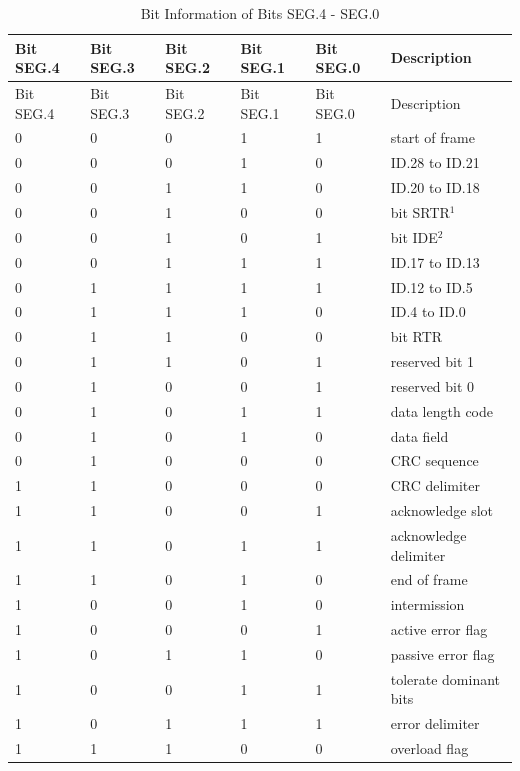\documentclass[main\_\_EN.tex]{subfiles}
\begin{document}
\begin{longtable}[c]{|p{2cm}<{\centering}|p{2cm}<{\centering}|p{2cm}<{\centering}|p{2cm}<{\centering}|p{2cm}<{\centering}|p{4cm}|}
    \caption{Bit Information of Bits SEG.4 - SEG.0}
    \label{table:Bit_information}\\
    \hline
    \rowcolor{lightgray}
   Bit SEG.4 & Bit SEG.3 & Bit SEG.2 & Bit SEG.1 & Bit SEG.0 & Description
   \\\hline
   \endfirsthead

   \hline
   \rowcolor{lightgray}
   Bit SEG.4 & Bit SEG.3 & Bit SEG.2 & Bit SEG.1 & Bit SEG.0 & Description
   \\\hline
   \endhead
   \endfoot
   \hline
   \endlastfoot

    0 & 0 & 0 & 1 & 1 & start of frame
    \\\hline
    0 & 0 & 0 & 1 & 0 & ID.28 to ID.21
    \\\hline
    0 & 0 & 1 & 1 & 0 & ID.20 to ID.18
    \\\hline
    0 & 0 & 1 & 0 & 0 & bit SRTR$^1$
    \\\hline
    0 & 0 & 1 & 0 & 1 & bit IDE$^2$
    \\\hline
    0 & 0 & 1 & 1 & 1 & ID.17 to ID.13
    \\\hline
    0 & 1 & 1 & 1 & 1 & ID.12 to ID.5
    \\\hline
    0 & 1 & 1 & 1 & 0 & ID.4 to ID.0
    \\\hline
    0 & 1 & 1 & 0 & 0 & bit RTR
    \\\hline
    0 & 1 & 1 & 0 & 1 & reserved bit 1
    \\\hline
    0 & 1 & 0 & 0 & 1 & reserved bit 0
    \\\hline
    0 & 1 & 0 & 1 & 1 & data length code
    \\\hline
    0 & 1 & 0 & 1 & 0 & data field
    \\\hline
    0 & 1 & 0 & 0 & 0 & CRC sequence
    \\\hline
    1 & 1 & 0 & 0 & 0 & CRC delimiter
    \\\hline
    1 & 1 & 0 & 0 & 1 & acknowledge slot
    \\\hline
    1 & 1 & 0 & 1 & 1 & acknowledge delimiter
    \\\hline
    1 & 1 & 0 & 1 & 0 & end of frame
    \\\hline
    1 & 0 & 0 & 1 & 0 & intermission
    \\\hline
    1 & 0 & 0 & 0 & 1 & active error flag
    \\\hline
    1 & 0 & 1 & 1 & 0 & passive error flag
    \\\hline
    1 & 0 & 0 & 1 & 1 & tolerate dominant bits
    \\\hline
    1 & 0 & 1 & 1 & 1 & error delimiter
    \\\hline
    1 & 1 & 1 & 0 & 0 & overload flag
    \\\hline
\end{longtable}
\end{document}
